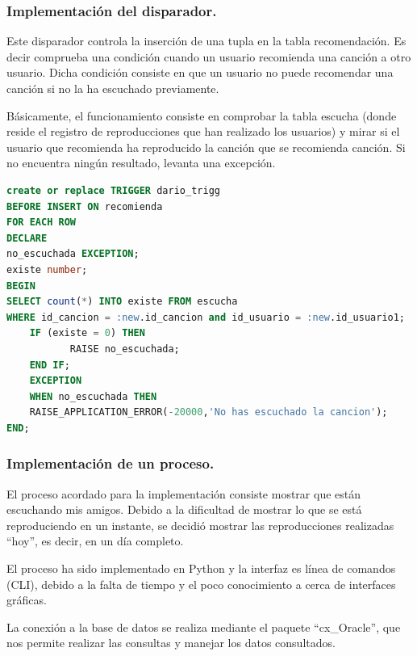 \documentclass[12pt,a4paper]{article}
\begin{document}
\subsubsection{Implementación del disparador.}
	Este disparador controla la inserción de una tupla en la tabla recomendación. Es decir comprueba una condición cuando un usuario recomienda una canción a otro usuario. Dicha condición consiste en que un usuario no puede recomendar una canción si no la ha escuchado previamente.
	
	Básicamente, el funcionamiento consiste en comprobar la tabla escucha (donde reside el registro de reproducciones que han realizado los usuarios) y mirar si el usuario que recomienda ha reproducido la canción que se recomienda canción. Si no encuentra ningún resultado, levanta una excepción.

\begin{lstlisting}[language=SQL]
create or replace TRIGGER dario_trigg
BEFORE INSERT ON recomienda
FOR EACH ROW
DECLARE
no_escuchada EXCEPTION;
existe number;
BEGIN
SELECT count(*) INTO existe FROM escucha 
WHERE id_cancion = :new.id_cancion and id_usuario = :new.id_usuario1;
    IF (existe = 0) THEN
           RAISE no_escuchada;
    END IF;
    EXCEPTION
    WHEN no_escuchada THEN
    RAISE_APPLICATION_ERROR(-20000,'No has escuchado la cancion');
END;
\end{lstlisting}
\newpage
\subsubsection{Implementación de un proceso.}
	El proceso acordado para la implementación consiste mostrar que están escuchando mis amigos. Debido a la dificultad de mostrar lo que se está reproduciendo en un instante, se decidió mostrar las reproducciones realizadas ``hoy'', es decir, en un día completo.
	
	El proceso ha sido implementado en Python y la interfaz es línea de comandos (CLI), debido a la falta de tiempo y el poco conocimiento a cerca de interfaces gráficas. 
	
	La conexión a la base de datos se realiza mediante el paquete ``cx\_Oracle'', que nos permite realizar las consultas y manejar los datos consultados.



\end{document}
